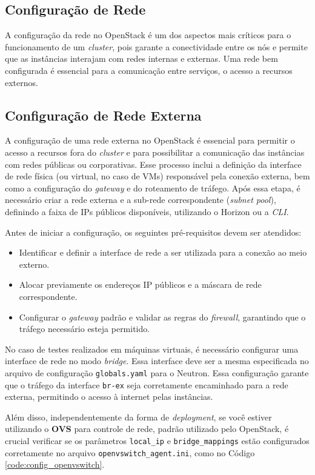 \subsection{Configuração de Rede}
A configuração da rede no OpenStack é um dos aspectos mais críticos para o funcionamento de um \textit{cluster}, pois garante a conectividade entre os nós e permite que as instâncias interajam com redes internas e externas. Uma rede bem configurada é essencial para a comunicação entre serviços, o acesso a recursos externos.

\subsection{Configuração de Rede Externa}
A configuração de uma rede externa no OpenStack é essencial para permitir o acesso a recursos fora do \textit{cluster} e para possibilitar a comunicação das instâncias com redes públicas ou corporativas. Esse processo inclui a definição da interface de rede física (ou virtual, no caso de VMs) responsável pela conexão externa, bem como a configuração do \textit{gateway} e do roteamento de tráfego. Após essa etapa, é necessário criar a rede externa e a sub-rede correspondente (\textit{subnet pool}), definindo a faixa de IPs públicos disponíveis, utilizando o Horizon ou a \textit{CLI}.

Antes de iniciar a configuração, os seguintes pré-requisitos devem ser atendidos:
\begin{itemize}
    \item Identificar e definir a interface de rede a ser utilizada para a conexão ao meio externo.
    \item Alocar previamente os endereços IP públicos e a máscara de rede correspondente.
    \item Configurar o \textit{gateway} padrão e validar as regras do \textit{firewall}, garantindo que o tráfego necessário esteja permitido.
\end{itemize}

No caso de testes realizados em máquinas virtuais, é necessário configurar uma interface de rede no modo \textit{bridge}. Essa interface deve ser a mesma especificada no arquivo de configuração \texttt{globals.yaml} para o Neutron. Essa configuração garante que o tráfego da interface \texttt{br-ex} seja corretamente encaminhado para a rede externa, permitindo o acesso à internet pelas instâncias. 

Além disso, independentemente da forma de \textit{deployment}, se você estiver utilizando o \textbf{OVS} para controle de rede, padrão utilizado pelo OpenStack, é crucial verificar se os parâmetros \texttt{local\_ip} e \texttt{bridge\_mappings} estão configurados corretamente no arquivo \texttt{openvswitch\_agent.ini}, como no Código \ref{code:config_openvswitch}.


